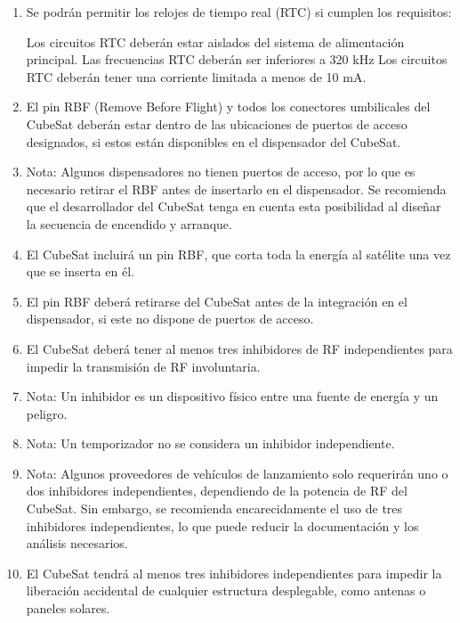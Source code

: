 \documentclass[11pt,a4paper,twoside]{report}
\begin{document}
\begin{enumerate}
		\item Se podrán permitir los relojes de tiempo real (RTC) si cumplen los requisitos:
		
		\subitem  Los circuitos RTC deberán estar aislados del sistema de alimentación principal.
		\subitem  Las frecuencias RTC deberán ser inferiores a 320 kHz
		\subitem  Los circuitos RTC deberán tener una corriente limitada a menos de 10 mA.
		
		\item El pin RBF (Remove Before Flight) y todos los conectores umbilicales del CubeSat deberán estar dentro de las ubicaciones de puertos de acceso designados, si estos están disponibles en el dispensador del CubeSat.
		
		\item Nota: Algunos dispensadores no tienen puertos de acceso, por lo que es necesario retirar el RBF antes de insertarlo en el dispensador. Se recomienda que el desarrollador del CubeSat tenga en cuenta esta posibilidad al diseñar la secuencia de encendido y arranque.
		
		\item El CubeSat incluirá un pin RBF, que corta toda la energía al satélite una vez que se inserta en él.
		
		\item El pin RBF deberá retirarse del CubeSat antes de la integración en el dispensador, si este no dispone de puertos de acceso.
		
		\item El CubeSat deberá tener al menos tres inhibidores de RF independientes para impedir la transmisión de RF involuntaria.
		
		\item Nota: Un inhibidor es un dispositivo físico entre una fuente de energía y un peligro.
		
		\item Nota: Un temporizador no se considera un inhibidor independiente.
		
		\item Nota: Algunos proveedores de vehículos de lanzamiento solo requerirán uno o dos inhibidores independientes, dependiendo de la potencia de RF del CubeSat. Sin embargo, se recomienda encarecidamente el uso de tres inhibidores independientes, lo que puede reducir la documentación y los análisis necesarios.
		
		\item El CubeSat tendrá al menos tres inhibidores independientes para impedir la liberación accidental de cualquier estructura desplegable, como antenas o paneles solares.
	\end{enumerate}
	
\end{document}
